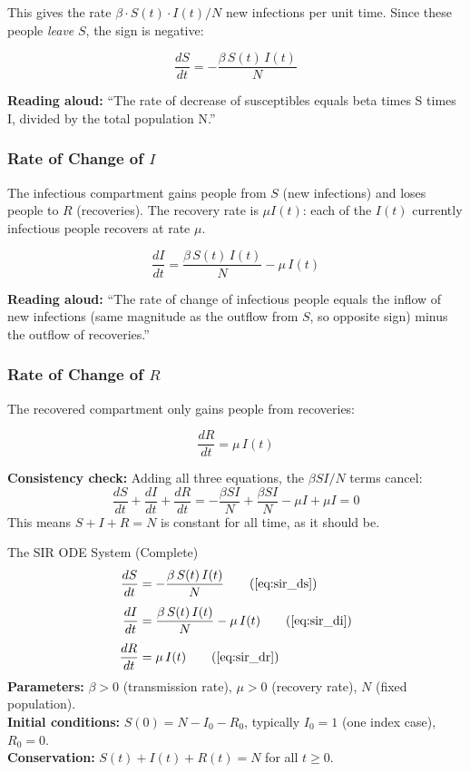 This gives the rate $\beta \cdot S(t) \cdot I(t) / N$ new infections per unit time. Since these people \emph{leave} $S$, the sign is negative:

\begin{equation}
\frac{dS}{dt} = -\frac{\beta\, S(t)\, I(t)}{N}
\label{eq:sir_ds}
\end{equation}

\textbf{Reading aloud:} ``The rate of decrease of susceptibles equals beta times S times I, divided by the total population N.''

\subsubsection*{Rate of Change of $I$}

The infectious compartment gains people from $S$ (new infections) and loses people to $R$ (recoveries). The recovery rate is $\mu I(t)$: each of the $I(t)$ currently infectious people recovers at rate $\mu$.

\begin{equation}
\frac{dI}{dt} = \frac{\beta\, S(t)\, I(t)}{N} - \mu\, I(t)
\label{eq:sir_di}
\end{equation}

\textbf{Reading aloud:} ``The rate of change of infectious people equals the inflow of new infections (same magnitude as the outflow from $S$, so opposite sign) minus the outflow of recoveries.''

\subsubsection*{Rate of Change of $R$}

The recovered compartment only gains people from recoveries:

\begin{equation}
\frac{dR}{dt} = \mu\, I(t)
\label{eq:sir_dr}
\end{equation}

\textbf{Consistency check:} Adding all three equations, the $\beta SI/N$ terms cancel:
\[
\frac{dS}{dt} + \frac{dI}{dt} + \frac{dR}{dt} = -\frac{\beta SI}{N} + \frac{\beta SI}{N} - \mu I + \mu I = 0
\]
This means $S + I + R = N$ is constant for all time, as it should be. \checkmark

\begin{mathbox}{The SIR ODE System (Complete)}
\begin{align}
    \frac{dS}{dt} &= -\frac{\beta\, S(t)\, I(t)}{N} \tag{\ref{eq:sir_ds}} \\[4pt]
    \frac{dI}{dt} &= \frac{\beta\, S(t)\, I(t)}{N} - \mu\, I(t) \tag{\ref{eq:sir_di}} \\[4pt]
    \frac{dR}{dt} &= \mu\, I(t) \tag{\ref{eq:sir_dr}}
\end{align}
\textbf{Parameters:} $\beta > 0$ (transmission rate), $\mu > 0$ (recovery rate), $N$ (fixed population).\\
\textbf{Initial conditions:} $S(0) = N - I_0 - R_0$, typically $I_0 = 1$ (one index case), $R_0 = 0$.\\
\textbf{Conservation:} $S(t) + I(t) + R(t) = N$ for all $t \geq 0$.
\end{mathbox}

